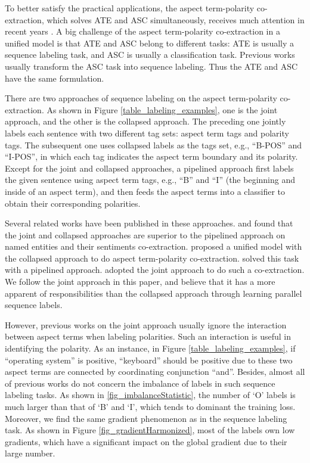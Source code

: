 \documentclass[11pt,a4paper]{article}
\begin{document}
To better satisfy the practical applications, the aspect term-polarity co-extraction, which solves ATE and ASC simultaneously, receives much attention in recent years \cite{Li2019a,Luo2019,Hu2019,Wan2020}. A big challenge of the aspect term-polarity co-extraction in a unified model is that ATE and ASC belong to different tasks: ATE is usually a sequence labeling task, and ASC is usually a classification task. Previous works usually transform the ASC task into sequence labeling. Thus the ATE and ASC have the same formulation.

There are two approaches of sequence labeling on the aspect term-polarity co-extraction. As shown in Figure \ref{table_labeling_examples}, one is the joint approach, and the other is the collapsed approach. The preceding one jointly labels each sentence with two different tag sets: aspect term tags and polarity tags. The subsequent one uses collapsed labels as the tags set, e.g., ``B-POS'' and ``I-POS'', in which each tag indicates the aspect term boundary and its polarity. Except for the joint and collapsed approaches, a pipelined approach first labels the given sentence using aspect term tags, e.g., ``B'' and ``I'' (the beginning and inside of an aspect term), and then feeds the aspect terms into a classifier to obtain their corresponding polarities.

Several related works have been published in these approaches. \citet{Mitchell2013} and \citet{Zhang2015} found that the joint and collapsed approaches are superior to the pipelined approach on named entities and their sentiments co-extraction. \citet{Li2019a} proposed a unified model with the collapsed approach to do aspect term-polarity co-extraction. \citet{Hu2019} solved this task with a pipelined approach. \citet{Luo2019} adopted the joint approach to do such a co-extraction. We follow the joint approach in this paper, and believe that it has a more apparent of responsibilities than the collapsed approach through learning parallel sequence labels.

However, previous works on the joint approach usually ignore the interaction between aspect terms when labeling polarities. Such an interaction is useful in identifying the polarity. As an instance, in Figure \ref{table_labeling_examples}, if ``operating system'' is positive, ``keyboard'' should be positive due to these two aspect terms are connected by coordinating conjunction ``and''. Besides, almost all of previous works do not concern the imbalance of labels in such sequence labeling tasks. As shown in \ref{fig_imbalanceStatistic}, the number of `O' labels is much larger than that of `B' and `I', which tends to dominant the training loss. Moreover, we find the same gradient phenomenon as \citet{Li2019} in the sequence labeling task. As shown in Figure \ref{fig_gradientHarmonized}, most of the labels own low gradients, which have a significant impact on the global gradient due to their large number.
\end{document}
